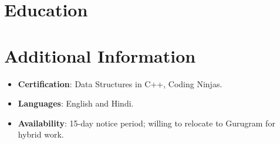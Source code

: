\documentclass[11pt,a4paper,sans]{moderncv}
\begin{document}
\section{Education}
\vspace{1pt}


\section{Additional Information}
\vspace{1pt}
\begin{itemize}
\item {\textbf{Certification}: Data Structures in C++, Coding Ninjas.}
\item {\textbf{Languages}: English and Hindi.}
\item {\textbf{Availability}: 15-day notice period; willing to relocate to Gurugram for hybrid work.}
\end{itemize}
\end{document}
